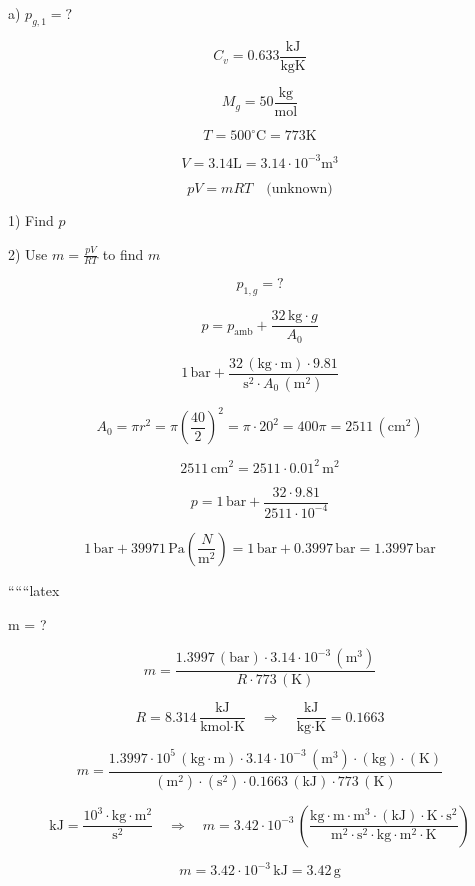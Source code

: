 a) $p_{g,1} = ?$

\[
C_v = 0.633 \frac{\text{kJ}}{\text{kgK}}
\]

\[
M_g = 50 \frac{\text{kg}}{\text{mol}}
\]

\[
T = 500^\circ \text{C} = 773 \text{K}
\]

\[
V = 3.14 \text{L} = 3.14 \cdot 10^{-3} \text{m}^3
\]

\[
pV = mRT \quad \text{(unknown)}
\]

1) Find $p$

2) Use $m = \frac{pV}{RT}$ to find $m$

\[
p_{1,g} = ?
\]

\[
p = p_{\text{amb}} + \frac{32 \, \text{kg} \cdot g}{A_0}
\]

\[
1 \, \text{bar} + \frac{32 \, (\text{kg} \cdot \text{m}) \cdot 9.81}{\text{s}^2 \cdot A_0 \, (\text{m}^2)}
\]

\[
A_0 = \pi r^2 = \pi \left(\frac{40}{2}\right)^2 = \pi \cdot 20^2 = 400 \pi = 2511 \, (\text{cm}^2)
\]

\[
2511 \, \text{cm}^2 = 2511 \cdot 0.01^2 \, \text{m}^2
\]

\[
p = 1 \, \text{bar} + \frac{32 \cdot 9.81}{2511 \cdot 10^{-4}}
\]

\[
1 \, \text{bar} + 39971 \, \text{Pa} \left(\frac{N}{\text{m}^2}\right) = 1 \, \text{bar} + 0.3997 \, \text{bar} = 1.3997 \, \text{bar}
\]

``````latex


m = ?

\[
m = \frac{1.3997 \, (\text{bar}) \cdot 3.14 \cdot 10^{-3} \, (\text{m}^3)}{R \cdot 773 \, (\text{K})}
\]

\[
R = 8.314 \, \frac{\text{kJ}}{\text{kmol} \cdot \text{K}} \quad \Rightarrow \quad \frac{\text{kJ}}{\text{kg} \cdot \text{K}} = 0.1663
\]

\[
m = \frac{1.3997 \cdot 10^5 \, (\text{kg} \cdot \text{m}) \cdot 3.14 \cdot 10^{-3} \, (\text{m}^3) \cdot (\text{kg}) \cdot (\text{K})}{(\text{m}^2) \cdot (\text{s}^2) \cdot 0.1663 \, (\text{kJ}) \cdot 773 \, (\text{K})}
\]

\[
\text{kJ} = \frac{10^3 \cdot \text{kg} \cdot \text{m}^2}{\text{s}^2} \quad \Rightarrow \quad m = 3.42 \cdot 10^{-3} \, \left( \frac{\text{kg} \cdot \text{m} \cdot \text{m}^3 \cdot (\text{kJ}) \cdot \text{K} \cdot \text{s}^2}{\text{m}^2 \cdot \text{s}^2 \cdot \text{kg} \cdot \text{m}^2 \cdot \text{K}} \right)
\]

\[
m = 3.42 \cdot 10^{-3} \, \text{kJ} = 3.42 \, \text{g}
\]
